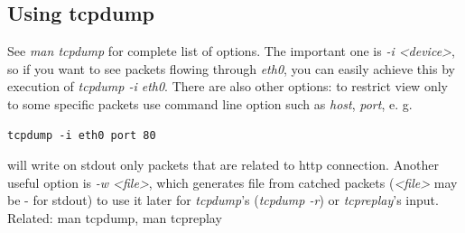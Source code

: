  \subsection{Using tcpdump}
  See \emph{man tcpdump} for complete list of options. The important one is
  \emph{-i <device>}, so if you want to see packets flowing through
  \emph{eth0}, you can easily achieve this by execution of \emph{tcpdump -i
  eth0}. There are also other options: to restrict view only to some specific
  packets use command line option such as \emph{host}, \emph{port}, e. g.
\begin{verbatim}
tcpdump -i eth0 port 80
\end{verbatim}
  will write on stdout only packets that are related to http connection.
  Another useful option is \emph{-w <file>}, which generates file from catched
  packets (\emph{<file>} may be \uv - for stdout) to use it later for
  \emph{tcpdump}'s (\emph{tcpdump -r}) or \emph{tcpreplay}'s input. \\[2mm]
  Related: man tcpdump, man tcpreplay
